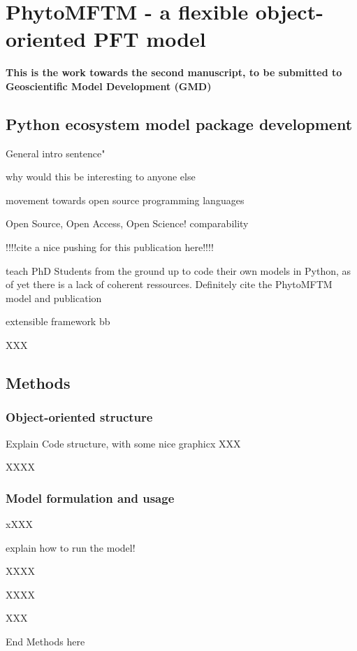 \chapter{PhytoMFTM - a flexible object-oriented PFT model}


\small {\textbf{This is the work towards the second manuscript, to be submitted to Geoscientific Model Development (GMD)}}


\normalsize
\section{Python ecosystem model package development}
General intro sentence" 

why would this be interesting to anyone else


movement towards open source programming languages

Open Source, Open Access, Open Science!
comparability

!!!!cite a nice pushing for this publication here!!!!

teach PhD Students from the ground up to code their own models in Python, as of yet there is a lack of coherent ressources. Definitely cite the PhytoMFTM model and publication \citep{AcevedoTrejos2016}

extensible framework
bb



XXX

\section{Methods}



\subsection{Object-oriented structure}
Explain Code structure, with some nice graphicx
XXX

XXXX

\subsection{Model formulation and usage}
xXXX

explain how to run the model!

XXXX

XXXX

XXX


End Methods here
